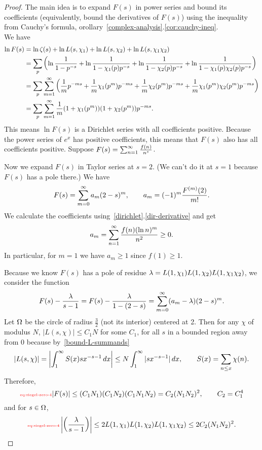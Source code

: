 \begin{proof}
The main idea is to expand $F(s)$ in power series and bound its coefficients (equivalently, bound the derivatives of $F(s)$) using the inequality from Cauchy's formula, orollary~\ref{complex-analysis}.\ref{cor:cauchy-ineq}.\\

We have
\begin{align*}
\ln F(s)&=\ln \zeta(s)+\ln L(s,\chi_1)+\ln L(s,\chi_2)+\ln L(s,\chi_1\chi_2)\\
&=\sum_{p} \left( {\ln \frac{1}{1-p^{-s}}+\ln \frac{1}{1-\chi_1(p)p^{-s}}+\ln \frac{1}{1-\chi_2(p)p^{-s}}+\ln \frac{1}{1-\chi_1(p)\chi_2(p)p^{-s}}} \right)\\
&=\sum_p\sum_{m=1}^{\infty} \left( {\frac{1}{m}p^{-ms}+ \frac{1}{m}\chi_1(p^m)p^{-ms}+\frac{1}{m}\chi_2(p^m)p^{-ms}
+\frac{1}{m}\chi_1(p^m)\chi_2(p^m)p^{-ms}} \right)\\
&=\sum_p\sum_{m=1}^{\infty}\frac{1}{m}(1+\chi_1(p^m))(1+\chi_2(p^m))p^{-ms}.
\end{align*}
This means $\ln F(s)$ is a Dirichlet series with all coefficients positive. Because the power series of $e^x$ has positive coefficients, this means that $F(s)$ also has all coefficients positive.  Suppose $F(s)=\sum_{n=1}^{\infty}\frac{f(n)}{n^s}$.

Now we expand $F(s)$ in Taylor series at $s=2$. (We can't do it at $s=1$ because $F(s)$ has a pole there.) We have
\[
F(s)=\sum_{m=0}^{\infty} a_m(2-s)^m,\qquad a_m=(-1)^m\frac{F^{(m)}(2)}{m!}.
\]
We calculate the coefficients using~\ref{dirichlet}.\ref{dir-derivative} and get
\[
a_m=\sum_{n=1}^{\infty}\frac{f(n)(\ln n)^m}{n^2}\ge 0.
\]
In particular, for $m=1$ we have $a_m\ge 1$ since $f(1)\ge 1$. 

Because we know $F(s)$ has a pole of residue $\lambda=L(1,\chi_1)L(1,\chi_2)L(1,\chi_1\chi_2)$, we consider the function
\[
F(s)-\frac{\lambda}{s-1}=F(s)-\frac{\lambda}{1-(2-s)}=\sum_{m=0}^{\infty}(a_m-\lambda)(2-s)^m.
\]
Let $\Omega$ be the circle of radius $\frac{3}{2}$ (not its interior) 
centered at 2. Then for any $\chi$ of modulus $N$, $|L(s,\chi)|\le C_1N$  for some $C_1$, for all $s$ in a bounded region away from 0 because by~\eqref{bound-L-summands}
\[
|L(s,\chi)|=\left| {\int_1^{\infty}S(x)sx^{-s-1}\,dx} \right|\le 
N\int_1^{\infty}|sx^{-s-1}|\,dx,\qquad S(x)=\sum_{n\le x}\chi(n).
\]
Therefore,
\begin{equation}
\llabel{eq:siegel-zero-4}
|F(s)|\le (C_1N_1)(C_1N_2)(C_1N_1N_2)=C_2(N_1N_2)^2,\qquad C_2=C_1^4
\end{equation}
and for $s\in \Omega$,
\begin{equation}
\llabel{eq:siegel-zero-4}
\ab{\pf{\la}{s-1}}\le 2L(1,\chi_1)L(1,\chi_2)L(1,\chi_1\chi_2)\le 2C_2(N_1N_2)^2.
\end{equation}


\end{proof}
